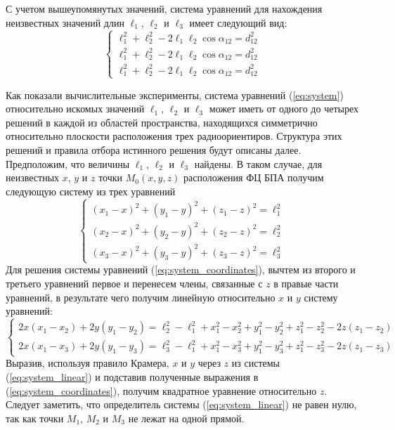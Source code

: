 \documentclass[../main.tex]{subfiles}
\begin{document}
С учетом вышеупомянутых значений, система уравнений для нахождения неизвестных значений длин $\ell_1$, $\ell_2$
и $\ell_3$ имеет следующий вид:
\begin{equation} \label{eq:system}
    \begin{cases}
    \ell_1^2 + \ell_2^2 - 2 \ell_1 \ell_2 \cos\alpha_{12} = d_{12}^2 \\
    \ell_1^2 + \ell_2^2 - 2 \ell_1 \ell_2 \cos\alpha_{12} = d_{12}^2 \\
    \ell_1^2 + \ell_2^2 - 2 \ell_1 \ell_2 \cos\alpha_{12} = d_{12}^2
    \end{cases}
\end{equation}

Как показали вычислительные эксперименты, система уравнений (\ref{eq:system}) относительно искомых значений $\ell_1$, $\ell_2$ и $\ell_3$ может иметь от одного до четырех решений в каждой из областей пространства, находящихся симметрично относительно плоскости расположения трех радиоориентиров. Структура этих решений и правила отбора истинного решения будут описаны далее. Предположим, что величины $\ell_1$, $\ell_2$ и $\ell_3$ найдены. В таком случае, для неизвестных $x$, $y$ и $z$ точки $M_0\left(x, y, z\right)$ расположения ФЦ БПА получим следующую систему из трех уравнений
\begin{equation}\label{eq:system_coordinates}
    \begin{cases}
        \left(x_1 - x\right)^2 + \left(y_1 - y\right)^2 + \left(z_1 - z\right)^2 = \ell_1^2 \\
        \left(x_2 - x\right)^2 + \left(y_2 - y\right)^2 + \left(z_2 - z\right)^2 = \ell_2^2 \\
        \left(x_3 - x\right)^2 + \left(y_3 - y\right)^2 + \left(z_3 - z\right)^2 = \ell_3^2
    \end{cases}
\end{equation}
Для решения системы уравнений (\ref{eq:system_coordinates}), вычтем из второго и третьего уравнений первое и перенесем члены, связанные с $z$ в правые части уравнений, в результате чего получим линейную относительно $x$ и $y$ систему уравнений:
\begin{equation}\label{eq:system_linear}
    \begin{cases}
        2x \left(x_1 - x_2\right) + 2 y \left(y_1 - y_2\right) =\ell_2^2 - \ell_1^2 + x_1^2 - x_2^2 + y_1^2 - y_2^2 + z_1^2 - z_2^2 - 2z\left(z_1 - z_2\right) \\
        2x \left(x_1 - x_3\right) + 2 y \left(y_1 - y_3\right) =\ell_3^2 - \ell_1^2 + x_1^2 - x_3^2 + y_1^2 - y_3^2 + z_1^2 - z_3^2 - 2z\left(z_1 - z_3\right)
    \end{cases}
\end{equation}
Выразив, используя правило Крамера, $x$ и $y$ через $z$ из системы (\ref{eq:system_linear}) и подставив полученные выражения в (\ref{eq:system_coordinates}), получим квадратное уравнение относительно $z$. Следует заметить, что определитель системы (\ref{eq:system_linear}) не равен нулю, так как точки $M_1$, $M_2$ и $M_3$ не лежат на одной прямой.
\end{document}
